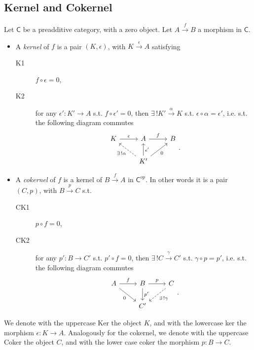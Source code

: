 \subsection{Kernel and Cokernel}

\begin{defn}[(Co)kernel]
	Let $\mathsf{C}$ be a preadditive category, with a zero object.
	Let $A \xrightarrow{f} B$ a morphism in $\mathsf{C}$.
	\begin{itemize}
		\item A {\em kernel} of $f$ is a pair $\left(K, \epsilon\right)$, with $K \xrightarrow{\epsilon} A$ satisfying
	\begin{description}
		\item[K1] $f \circ \epsilon = 0$,
		\item[K2] for any $\epsilon'\colon K' \to A$ s.t. $f \circ \epsilon' = 0$, then
			$\exists\, ! K' \xrightarrow{\alpha} K$ s.t. $\epsilon \circ \alpha = \epsilon'$, i.e. s.t. the following diagram commutes
			\begin{equation}
			\begin{tikzcd}
				K \arrow[r, "\epsilon", rightarrow] & A \arrow[r, "f", rightarrow] & B\\
				    & K' \arrow[lu, "\exists\, ! \alpha", dashrightarrow] \arrow[u, "\epsilon'"', rightarrow] \arrow[ru, "0"', rightarrow] & 
			\end{tikzcd}
			.\end{equation} 
	\end{description} 
	\item A {\em cokernel} of $f$ is a kernel of $B \xrightarrow{f} A$ in $\mathsf{C}^{op}$.
		In other words it is a pair $\left(C, p\right)$, with $B \xrightarrow{p} C$ s.t.
	\begin{description}
		\item[CK1] $p \circ f = 0$,
		\item[CK2] for any $p'\colon B \to C'$ s.t. $p' \circ f = 0$, then
			$\exists\, ! C \xrightarrow{\gamma} C'$ s.t. $\gamma \circ p = p'$, i.e. s.t. the following diagram commutes
			\begin{equation}
			\begin{tikzcd}
				A \arrow[r, "f", rightarrow] \arrow[rd, "0"', rightarrow]  & B \arrow[r, "p", rightarrow] \arrow[d, "p'", rightarrow] & C \arrow[ld, "\exists\, ! \gamma", dashrightarrow] \\
				    & C'& 
			\end{tikzcd}
			.\end{equation} 
	\end{description} 
	\end{itemize}
	We denote with the uppercase Ker the object $K$, and with the lowercase ker the morphism $\epsilon\colon K \to A$.\newline
	Analogously for the cokernel, we denote with the uppercase Coker the object $C$, and with the lower case coker the morphism $p\colon B \to C$.
\end{defn}

